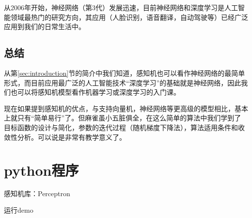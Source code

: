 \documentclass[a4paper,8pt]{article}
\begin{document}
从2006年开始，神经网络（第3代）发展迅速，目前神经网络和深度学习是人工智能领域最热门的研究方向，其应用（人脸识别，语音翻译，自动驾驶等）已经广泛应用到我们的日常生活中。

\subsection{总结}
从第\ref{sec:introduction}节的简介中我们知道，感知机也可以看作神经网络的最简单形式，而目前应用最广泛的人工智能技术“深度学习”的基础就是神经网络，因此我们也可以将感知机模型看作机器学习或深度学习的入门课。

现在如果提到感知机的优点，与支持向量机，神经网络等更高级的模型相比，基本上就只有“简单易行”了。但麻雀虽小五脏俱全，在这么简单的算法中我们学到了
目标函数的设计与简化，参数的迭代过程（随机梯度下降法），算法适用条件和收敛性分析。可以说是非常有教学意义了。


\appendix

\section{python程序}
\label{sec:pythoncode}
感知机库：Perceptron


运行demo

\end{document}
